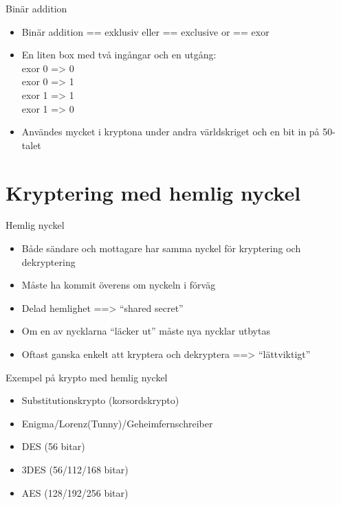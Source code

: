 \documentclass{beamer}
\begin{document}
\begin{frame}{Binär addition}
\begin{itemize}
\item Binär addition
\pause == exklusiv eller
\pause == exclusive or
\pause == exor
\pause \item En liten box med två ingångar och en utgång:\\
 exor 0 => 0 \\
 exor 0 => 1 \\
 exor 1 => 1 \\
 exor 1 => 0 \\
\pause \item Användes mycket i kryptona under andra världskriget och en bit in på 50-talet
\end{itemize}
\end{frame}

\section{Kryptering med hemlig nyckel}

\begin{frame}{Hemlig nyckel}
\begin{itemize}
\item Både sändare och mottagare har samma nyckel för kryptering och dekryptering
\pause \item Måste ha kommit överens om nyckeln i förväg
\pause \item Delad hemlighet ==> ``shared secret''
\pause \item Om en av nycklarna ``läcker ut''  måste nya nycklar utbytas
\pause \item Oftast ganska enkelt att kryptera och dekryptera ==> ``lättviktigt'' 
\end{itemize}
\end{frame}

\begin{frame}{Exempel på krypto med hemlig nyckel}
\begin{itemize}
\item Substitutionskrypto (korsordskrypto)
\pause \item Enigma/Lorenz(Tunny)/Geheimfernschreiber
\pause \item DES (56 bitar)
\pause \item 3DES (56/112/168 bitar)
\pause \item AES (128/192/256 bitar)
\end{itemize}
\end{frame}
\end{document}
